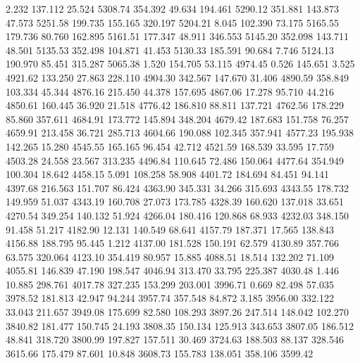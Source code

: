    2.232  137.112   25.524      5308.74
 354.392   49.634  194.461      5290.12
 351.881  143.873   47.573      5251.58
 199.735  155.165  320.197      5204.21
   8.045  102.390   73.175      5165.55
 179.736   80.760  162.895      5161.51
 177.347   48.911  346.553      5145.20
 352.098  143.711   48.501      5135.53
 352.498  104.871   41.453      5130.33
 185.591   90.684    7.746      5124.13
 190.970   85.451  315.287      5065.38
   1.520  154.705   53.115      4974.45
   0.526  145.651    3.525      4921.62
 133.250   27.863  228.110      4904.30
 342.567  147.670   31.406      4890.59
 358.849  103.334   45.344      4876.16
 215.450   44.378  157.695      4867.06
  17.278   95.710   44.216      4850.61
 160.445   36.920   21.518      4776.42
 186.810   88.811  137.721      4762.56
 178.229   85.860  357.611      4684.91
 173.772  145.894  348.204      4679.42
 187.683  151.758   76.257      4659.91
 213.458   36.721  285.713      4604.66
 190.088  102.345  357.941      4577.23
 195.938  142.265   15.280      4545.55
 165.165   96.454   42.712      4521.59
 168.539   33.595   17.759      4503.28
  24.558   23.567  313.235      4496.84
 110.645   72.486  150.064      4477.64
 354.949  100.304   18.642      4458.15
   5.091  108.258   58.908      4401.72
 184.694   84.451   94.141      4397.68
 216.563  151.707   86.424      4363.90
 345.331   34.266  315.693      4343.55
 178.732  149.959   51.037      4343.19
 160.708   27.073  173.785      4328.39
 160.620  137.018   33.651      4270.54
 349.254  140.132   51.924      4266.04
 180.416  120.868   68.933      4232.03
 348.150   91.458   51.217      4182.90
  12.131  140.549   68.641      4157.79
 187.371   17.565  138.843      4156.88
 188.795   95.445    1.212      4137.00
 181.528  150.191   62.579      4130.89
 357.766   63.575  320.064      4123.10
 354.419   80.957   15.885      4088.51
  18.514  132.202   71.109      4055.81
 146.839   47.190  198.547      4046.94
 313.470   33.795  225.387      4030.48
   1.446   10.885  298.761      4017.78
 327.235  153.299  203.001      3996.71
   0.669   82.498   57.035      3978.52
 181.813   42.947   94.244      3957.74
 357.548   84.872    3.185      3956.00
 332.122   33.043  211.657      3949.08
 175.699   82.580  108.293      3897.26
 247.514  148.042  102.270      3840.82
 181.477  150.745   24.193      3808.35
 150.134  125.913  343.653      3807.05
 186.512   48.841  318.720      3800.99
 197.827  157.511   30.469      3724.63
 188.503   88.137  328.546      3615.66
 175.479   87.601   10.848      3608.73
 155.783  138.051  358.106      3599.42
